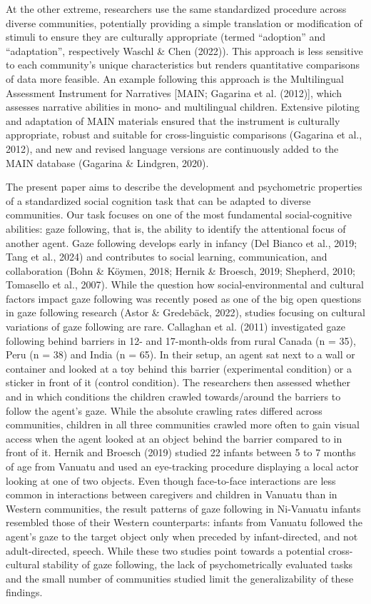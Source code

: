 \documentclass[
  man,floatsintext]{apa7}
\begin{document}
At the other extreme, researchers use the same standardized procedure across diverse communities, potentially providing a simple translation or modification of stimuli to ensure they are culturally appropriate (termed ``adoption'' and ``adaptation'', respectively Waschl \& Chen (2022)).
This approach is less sensitive to each community's unique characteristics but renders quantitative comparisons of data more feasible.
An example following this approach is the Multilingual Assessment Instrument for Narratives {[}MAIN; Gagarina et al. (2012){]}, which assesses narrative abilities in mono- and multilingual children.
Extensive piloting and adaptation of MAIN materials ensured that the instrument is culturally appropriate, robust and suitable for cross-linguistic comparisons (Gagarina et al., 2012), and new and revised language versions are continuously added to the MAIN database (Gagarina \& Lindgren, 2020).

The present paper aims to describe the development and psychometric properties of a standardized social cognition task that can be adapted to diverse communities.
Our task focuses on one of the most fundamental social-cognitive abilities: gaze following, that is, the ability to identify the attentional focus of another agent.
Gaze following develops early in infancy (Del Bianco et al., 2019; Tang et al., 2024) and contributes to social learning, communication, and collaboration (Bohn \& Köymen, 2018; Hernik \& Broesch, 2019; Shepherd, 2010; Tomasello et al., 2007).
While the question how social-environmental and cultural factors impact gaze following was recently posed as one of the big open questions in gaze following research (Astor \& Gredebäck, 2022), studies focusing on cultural variations of gaze following are rare.
Callaghan et al. (2011) investigated gaze following behind barriers in 12- and 17-month-olds from rural Canada (n = 35), Peru (n = 38) and India (n = 65). In their setup, an agent sat next to a wall or container and looked at a toy behind this barrier (experimental condition) or a sticker in front of it (control condition). The researchers then assessed whether and in which conditions the children crawled towards/around the barriers to follow the agent's gaze. While the absolute crawling rates differed across communities, children in all three communities crawled more often to gain visual access when the agent looked at an object behind the barrier compared to in front of it.
Hernik and Broesch (2019) studied 22 infants between 5 to 7 months of age from Vanuatu and used an eye-tracking procedure displaying a local actor looking at one of two objects.
Even though face-to-face interactions are less common in interactions between caregivers and children in Vanuatu than in Western communities, the result patterns of gaze following in Ni-Vanuatu infants resembled those of their Western counterparts: infants from Vanuatu followed the agent's gaze to the target object only when preceded by infant-directed, and not adult-directed, speech.
While these two studies point towards a potential cross-cultural stability of gaze following,
the lack of psychometrically evaluated tasks and the small number of communities studied limit the generalizability of these findings.
\end{document}
